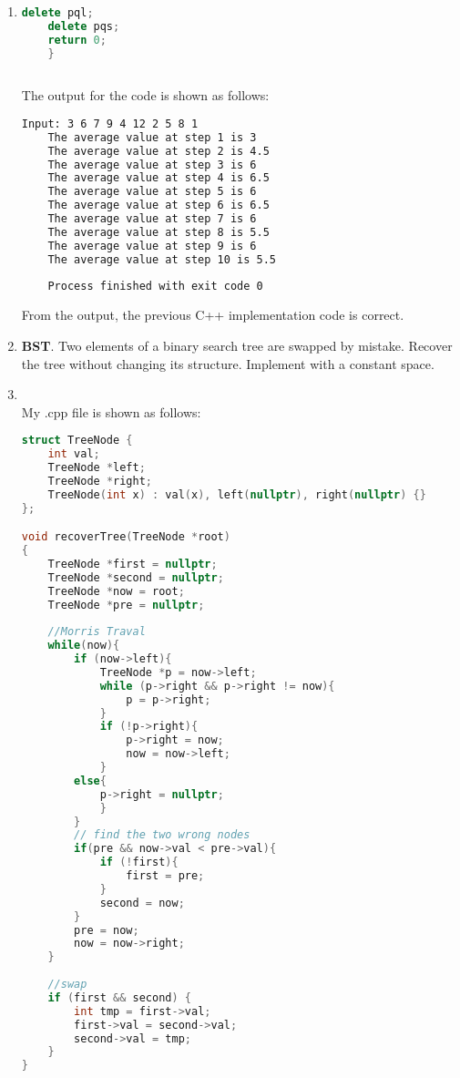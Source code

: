 \documentclass[12pt,a4paper]{article}
\makeatletter
\newtheorem*{solution}{Solution}
\theoremstyle{definition}
\renewenvironment{solution}[1][Solution] {\par\pushQED{\qed}\normalfont\topsep6\p@\@plus6\p@\relax\trivlist\item[\hskip\labelsep\bfseries#1\@addpunct{.}]\ignorespaces}{\popQED\endtrivlist\@endpefalse} \makeatother
\makeatother
\begin{document}
\begin{enumerate}
\begin{solution}
\begin{lstlisting}[language=C++]
	delete pql;
	delete pqs;
	return 0;
	}
	
	\end{lstlisting}
	
	\newpage
	The output for the code is shown as follows:
	\begin{lstlisting}[language=bash]
	Input: 3 6 7 9 4 12 2 5 8 1 
	The average value at step 1 is 3
	The average value at step 2 is 4.5
	The average value at step 3 is 6
	The average value at step 4 is 6.5
	The average value at step 5 is 6
	The average value at step 6 is 6.5
	The average value at step 7 is 6
	The average value at step 8 is 5.5
	The average value at step 9 is 6
	The average value at step 10 is 5.5
	
	Process finished with exit code 0
	\end{lstlisting}
	From the output, the previous C++ implementation code is  correct.
	
\end{solution}


\item  \textbf{BST}. Two elements of a binary search tree are swapped by mistake. Recover the tree without changing its structure. Implement with a constant space.

\begin{solution}
\hspace*{\fill}\\
My .cpp file is shown as follows:
\begin{lstlisting}[language=C++]
 struct TreeNode {
	int val;
	TreeNode *left;
	TreeNode *right;
	TreeNode(int x) : val(x), left(nullptr), right(nullptr) {}
};

void recoverTree(TreeNode *root)
{
	TreeNode *first = nullptr;
	TreeNode *second = nullptr;
	TreeNode *now = root;
	TreeNode *pre = nullptr;
	
	//Morris Traval
	while(now){
		if (now->left){
			TreeNode *p = now->left;
			while (p->right && p->right != now){
				p = p->right;
			}
			if (!p->right){
				p->right = now;
				now = now->left;
			}
		else{
			p->right = nullptr;
			}
		}
		// find the two wrong nodes
		if(pre && now->val < pre->val){
			if (!first){
				first = pre;
			}
			second = now;
		}
		pre = now;
		now = now->right;
	}
	
	//swap
	if (first && second) {
		int tmp = first->val;
		first->val = second->val;
		second->val = tmp;
	}
}
\end{lstlisting}

\end{solution}


\end{enumerate}
\end{document}

